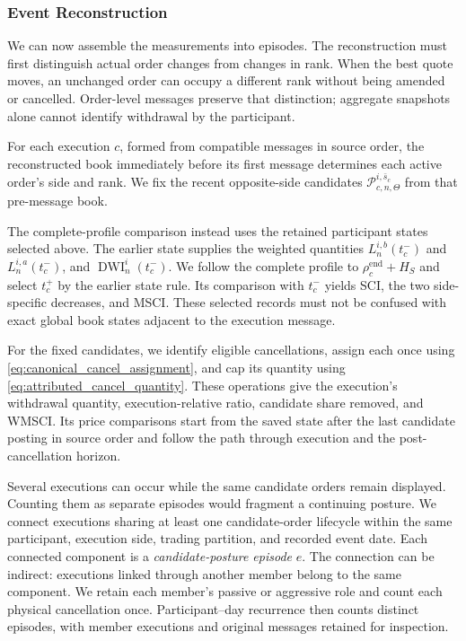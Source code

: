 \documentclass[11pt]{article}
\begin{document}
\subsubsection{Event Reconstruction}
\label{subsec:event_reconstruction}

We can now assemble the measurements into episodes. The reconstruction must first distinguish actual order changes from changes in rank. When the best quote moves, an unchanged order can occupy a different rank without being amended or cancelled. Order-level messages preserve that distinction; aggregate snapshots alone cannot identify withdrawal by the participant.

For each execution $c$, formed from compatible messages in source order, the reconstructed book immediately before its first message determines each active order's side and rank. We fix the recent opposite-side candidates $\mathcal{P}^{i,\bar{s}_c}_{c,n,\Theta}$ from that pre-message book.

The complete-profile comparison instead uses the retained participant states selected above. The earlier state supplies the weighted quantities $L^{i,b}_{n}(t_c^{-})$ and $L^{i,a}_{n}(t_c^{-})$, and $\operatorname{DWI}^{i}_{n}(t_c^{-})$. We follow the complete profile to $\rho_c^{\mathrm{end}}+H_S$ and select $t_c^{+}$ by the earlier state rule. Its comparison with $t_c^{-}$ yields SCI, the two side-specific decreases, and MSCI. These selected records must not be confused with exact global book states adjacent to the execution message.

For the fixed candidates, we identify eligible cancellations, assign each once using \cref{eq:canonical_cancel_assignment}, and cap its quantity using \cref{eq:attributed_cancel_quantity}. These operations give the execution's withdrawal quantity, execution-relative ratio, candidate share removed, and WMSCI. Its price comparisons start from the saved state after the last candidate posting in source order and follow the path through execution and the post-cancellation horizon.

Several executions can occur while the same candidate orders remain displayed. Counting them as separate episodes would fragment a continuing posture. We connect executions sharing at least one candidate-order lifecycle within the same participant, execution side, trading partition, and recorded event date. Each connected component is a \emph{candidate-posture episode} $e$. The connection can be indirect: executions linked through another member belong to the same component. We retain each member's passive or aggressive role and count each physical cancellation once. Participant--day recurrence then counts distinct episodes, with member executions and original messages retained for inspection.
\end{document}
